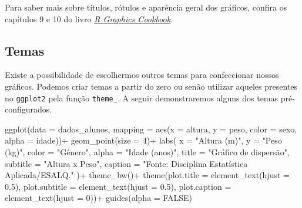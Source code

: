 \documentclass[
  brazilian,
]{book}
\newenvironment{Shaded}{\begin{snugshade}}{\end{snugshade}}
\newcommand{\AttributeTok}[1]{\textcolor[rgb]{0.77,0.63,0.00}{#1}}
\newcommand{\ConstantTok}[1]{\textcolor[rgb]{0.00,0.00,0.00}{#1}}
\newcommand{\DecValTok}[1]{\textcolor[rgb]{0.00,0.00,0.81}{#1}}
\newcommand{\FloatTok}[1]{\textcolor[rgb]{0.00,0.00,0.81}{#1}}
\newcommand{\FunctionTok}[1]{\textcolor[rgb]{0.00,0.00,0.00}{#1}}
\newcommand{\NormalTok}[1]{#1}
\newcommand{\SpecialCharTok}[1]{\textcolor[rgb]{0.00,0.00,0.00}{#1}}
\newcommand{\StringTok}[1]{\textcolor[rgb]{0.31,0.60,0.02}{#1}}
\begin{document}
Para saber mais sobre títulos, rótulos e aparência geral dos gráficos, confira os capítulos 9 e 10 do livro \href{https://r-graphics.org/chapter-appearance}{\emph{R Graphics Cookbook}}.

\hypertarget{temas}{%
\subsection{Temas}\label{temas}}

Existe a possibilidade de escolhermos outros temas para confeccionar nossos gráficos. Podemos criar temas a partir do zero ou senão utilizar aqueles presentes no \texttt{ggplot2} pela função \texttt{theme\_}. A seguir demonstraremos alguns dos temas pré-configurados.

\begin{Shaded}
\begin{Highlighting}[]
\FunctionTok{ggplot}\NormalTok{(}\AttributeTok{data =}\NormalTok{ dados\_alunos,}
       \AttributeTok{mapping =} \FunctionTok{aes}\NormalTok{(}\AttributeTok{x =}\NormalTok{ altura,}
                     \AttributeTok{y =}\NormalTok{ peso,}
                     \AttributeTok{color =}\NormalTok{ sexo,}
                     \AttributeTok{alpha =}\NormalTok{ idade))}\SpecialCharTok{+}
  \FunctionTok{geom\_point}\NormalTok{(}\AttributeTok{size =} \DecValTok{4}\NormalTok{)}\SpecialCharTok{+}
  \FunctionTok{labs}\NormalTok{(}
    \AttributeTok{x =} \StringTok{"Altura (m)"}\NormalTok{,}
    \AttributeTok{y =} \StringTok{"Peso (kg)"}\NormalTok{,}
    \AttributeTok{color =} \StringTok{"Gênero"}\NormalTok{,}
    \AttributeTok{alpha =} \StringTok{"Idade (anos)"}\NormalTok{,}
    \AttributeTok{title =} \StringTok{"Gráfico de dispersão"}\NormalTok{,}
    \AttributeTok{subtitle =} \StringTok{"Altura x Peso"}\NormalTok{,}
    \AttributeTok{caption =} \StringTok{"Fonte: Disciplina Estatística Aplicada/ESALQ."}
\NormalTok{  )}\SpecialCharTok{+}
  \FunctionTok{theme\_bw}\NormalTok{()}\SpecialCharTok{+}
  \FunctionTok{theme}\NormalTok{(}\AttributeTok{plot.title =} \FunctionTok{element\_text}\NormalTok{(}\AttributeTok{hjust =} \FloatTok{0.5}\NormalTok{),}
        \AttributeTok{plot.subtitle =} \FunctionTok{element\_text}\NormalTok{(}\AttributeTok{hjust =} \FloatTok{0.5}\NormalTok{),}
        \AttributeTok{plot.caption =} \FunctionTok{element\_text}\NormalTok{(}\AttributeTok{hjust =} \DecValTok{0}\NormalTok{))}\SpecialCharTok{+}
  \FunctionTok{guides}\NormalTok{(}\AttributeTok{alpha =} \ConstantTok{FALSE}\NormalTok{)}
\end{Highlighting}
\end{Shaded}
\end{document}
